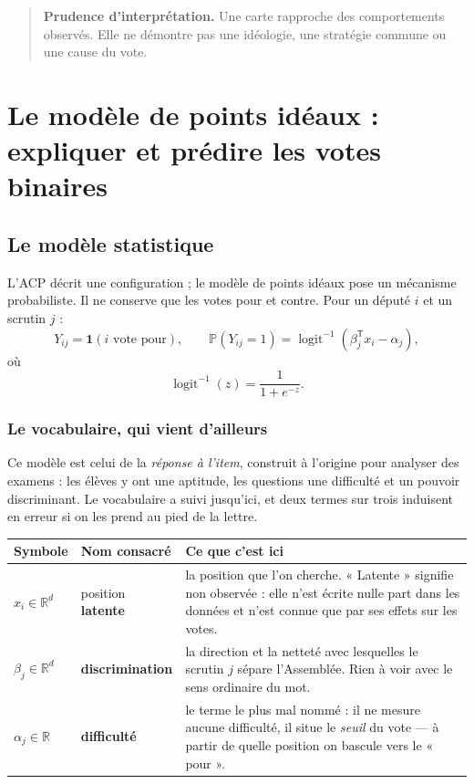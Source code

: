 \documentclass[11pt,a4paper]{article}
\newcommand{\ind}{\mathbf{1}}
\newcommand{\Pp}{\mathbb{P}}
\newcommand{\R}{\mathbb{R}}
\newcommand{\prudence}[1]{\begin{quote}\small\color{red!55!black}\textbf{Prudence d'interprétation.} #1\end{quote}}
\begin{document}
\prudence{Une carte rapproche des comportements observés. Elle ne démontre pas
une idéologie, une stratégie commune ou une cause du vote.}

\section{Le modèle de points idéaux : expliquer et prédire les votes binaires}
\label{sec:ideal}

\subsection{Le modèle statistique}

L'ACP décrit une configuration ; le modèle de points idéaux pose un mécanisme
probabiliste. Il ne conserve que les votes pour et contre. Pour un député $i$
et un scrutin $j$ :
\[
 Y_{ij}=\ind(\text{$i$ vote pour}),\qquad
 \Pp(Y_{ij}=1)=\operatorname{logit}^{-1}(\beta_j^{\mathsf T}x_i-\alpha_j),
\]
où
\[
 \operatorname{logit}^{-1}(z)=\frac{1}{1+e^{-z}}.
\]

\subsubsection*{Le vocabulaire, qui vient d'ailleurs}

Ce modèle est celui de la \emph{réponse à l'item}, construit à l'origine pour
analyser des examens : les élèves y ont une aptitude, les questions une
difficulté et un pouvoir discriminant. Le vocabulaire a suivi jusqu'ici, et
deux termes sur trois induisent en erreur si on les prend au pied de la lettre.

\begin{center}
\begin{tabular}{>{\raggedright\arraybackslash}p{.14\linewidth}p{.30\linewidth}p{.44\linewidth}}
\toprule
Symbole & Nom consacré & Ce que c'est ici \\
\midrule
$x_i\in\R^d$ & position \textbf{latente} & la position que l'on cherche. « Latente » signifie non observée : elle n'est écrite nulle part dans les données et n'est connue que par ses effets sur les votes. \\
$\beta_j\in\R^d$ & \textbf{discrimination} & la direction et la netteté avec lesquelles le scrutin $j$ sépare l'Assemblée. Rien à voir avec le sens ordinaire du mot. \\
$\alpha_j\in\R$ & \textbf{difficulté} & le terme le plus mal nommé : il ne mesure aucune difficulté, il situe le \emph{seuil} du vote — à partir de quelle position on bascule vers le « pour ». \\
\bottomrule
\end{tabular}
\end{center}
\end{document}
